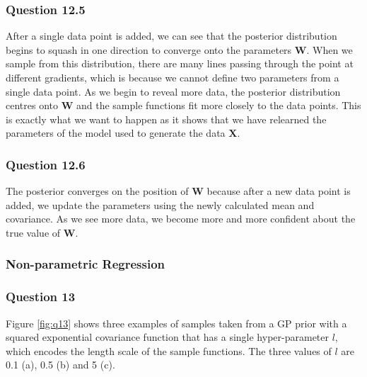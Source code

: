 \documentclass[10pt, a4paper, twocolumn]{article} %
\begin{document}
\subsubsection*{Question 12.5}
After a single data point is added, we can see that the posterior distribution begins to squash in one direction to converge onto the parameters $\mathbf{W}$. When we sample from this distribution, there are many lines passing through the point at different gradients, which is because we cannot define two parameters from a single data point. As we begin to reveal more data, the posterior distribution centres onto $\mathbf{W}$ and the sample functions fit more closely to the data points. This is exactly what we want to happen as it shows that we have relearned the parameters of the model used to generate the data $\mathbf{X}$.

\subsubsection*{Question 12.6}
The posterior converges on the position of $\mathbf{W}$ because after a new data point is added, we update the parameters using the newly calculated mean and covariance. As we see more data, we become more and more confident about the true value of $\mathbf{W}$.


\subsubsection{Non-parametric Regression}
\subsubsection*{Question 13}

Figure \ref{fig:q13} shows three examples of samples taken from a GP prior with a squared exponential covariance function that has a single hyper-parameter $l$, which encodes the length scale of the sample functions. The three values of $l$ are 0.1 (a), 0.5 (b) and 5 (c).
\end{document}
